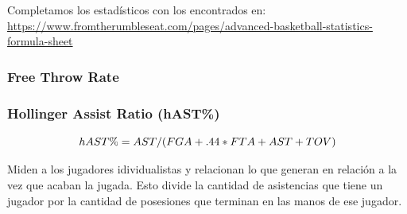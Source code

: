 \documentclass[
]{article}
\newenvironment{Shaded}{\begin{snugshade}}{\end{snugshade}}
\newcommand{\DecValTok}[1]{\textcolor[rgb]{0.00,0.00,0.81}{#1}}
\newcommand{\KeywordTok}[1]{\textcolor[rgb]{0.13,0.29,0.53}{\textbf{#1}}}
\newcommand{\NormalTok}[1]{#1}
\newcommand{\OperatorTok}[1]{\textcolor[rgb]{0.81,0.36,0.00}{\textbf{#1}}}
\newcommand{\StringTok}[1]{\textcolor[rgb]{0.31,0.60,0.02}{#1}}
\begin{document}
Completamos los estadísticos con los encontrados en:
\url{https://www.fromtherumbleseat.com/pages/advanced-basketball-statistics-formula-sheet}

\hypertarget{free-throw-rate}{%
\subsubsection{Free Throw Rate}\label{free-throw-rate}}

\begin{Shaded}
\end{Shaded}

\hypertarget{hollinger-assist-ratio-hast}{%
\subsubsection{Hollinger Assist Ratio
(hAST\%)}\label{hollinger-assist-ratio-hast}}

\[
  \makebox[\linewidth]{$hAST\% = AST / (FGA + .44 * FTA + AST + TOV)$}
\]

Miden a los jugadores idividualistas y relacionan lo que generan en
relación a la vez que acaban la jugada. Esto divide la cantidad de
asistencias que tiene un jugador por la cantidad de posesiones que
terminan en las manos de ese jugador.
\end{document}
